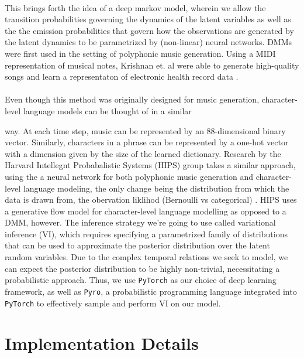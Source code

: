 \documentclass[justified,nobib]{tufte-handout}
\begin{document}
\paragraph{} This brings forth the idea of a deep markov model, wherein we allow the transition probabilities governing the dynamics of the latent variables as well as the the emission probabilities that govern how the observations are generated by the latent dynamics to be parametrized by (non-linear) neural networks.
DMMs were first used in the setting of polyphonic music generation. Using a MIDI representation of musical notes, Krishnan et. al were able to generate high-quality songs and learn a representaton of electronic health record data \cite{dmm}. 

\paragraph{} Even though this method was originally designed for music generation, character-level language models can be thought of in a similar \begin{fullwidth}
way. At each time step, music can be represented by an 88-dimensional binary vector. Similarly, characters in a phrase can be represented by a one-hot vector with a dimension given by the size of the learned dictionary. Research by the Harvard Intellegnt Probabalistic Systems (HIPS) group takes a similar approach, using the a neural network for both polyphonic music generation and character-level language modeling, the only change being the distribution from which the data is drawn from, the obervation liklihod (Bernoulli vs categorical) \cite{discreteflow}. HIPS uses a generative flow model for character-level language modelling as opposed to a DMM, however. The inference strategy we're going to use called variational inference (VI), which requires specifying a parametrized family of distributions that can be used to approximate the posterior distribution over the latent random variables. Due to the complex temporal relations we seek to model, we can expect the posterior distribution to be highly non-trivial, necessitating a probabilistic approach. Thus, we use \texttt{PyTorch} as our choice of deep learning framework, as well as \texttt{Pyro}, a probabilistic programming language integrated into \texttt{PyTorch} to effectively sample and perform VI on our model.
 
\section{Implementation Details} 

\end{fullwidth}
\end{document}
